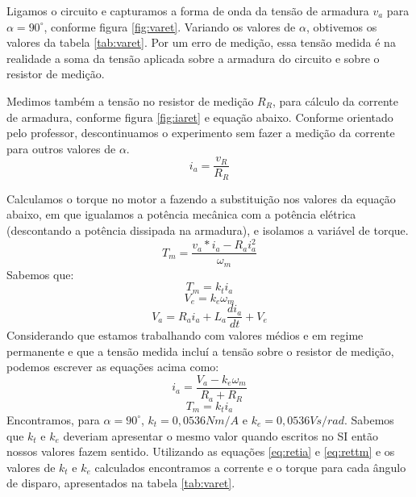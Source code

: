 \documentclass{article}
\begin{document}
Ligamos o circuito e capturamos a forma de onda da tensão de armadura $v_a$ para $\alpha=90^\circ$, conforme figura \ref{fig:varet}. Variando os valores de $\alpha$, obtivemos os valores da tabela \ref{tab:varet}. Por um erro de medição, essa tensão medida é na realidade a soma da tensão aplicada sobre a armadura do circuito e sobre o resistor de medição.

Medimos também a tensão no resistor de medição $R_R$, para cálculo da corrente de armadura, conforme figura \ref{fig:iaret} e equação abaixo. Conforme orientado pelo professor, descontinuamos o experimento sem fazer a medição da corrente para outros valores de $\alpha$. 
\begin{equation}
i_a=\frac{v_R}{R_R}
\end{equation}

Calculamos o torque no motor a fazendo a substituição nos valores da equação abaixo, em que igualamos a potência mecânica com a potência elétrica (descontando a potência dissipada na armadura), e isolamos a variável de torque.
\begin{equation}
T_m=\frac{v_a*i_a - R_a i_a^2}{\omega_m}
\end{equation}
Sabemos que: 
\begin{equation}
T_m = k_t i_a
\end{equation}
\begin{equation}
V_e = k_e \omega_m
\end{equation}
\begin{equation}
V_a = R_a i_a + L_a\frac{di_a}{dt} + V_e
\end{equation}
Considerando que estamos trabalhando com valores médios e em regime permanente e que a tensão medida incluí a tensão sobre o resistor de medição, podemos escrever as equações acima como:
\begin{equation}
i_a = \frac{V_a - k_e\omega_m}{R_a + R_R}
\label{eq:retia}
\end{equation}
\begin{equation}
T_m = k_t i_a
\label{eq:rettm}
\end{equation}
Encontramos, para $\alpha = 90^\circ$, $k_t = 0,0536 N m/A$ e $k_e = 0,0536 V s/rad$. Sabemos que $k_t$ e $k_e$ deveriam apresentar o mesmo valor quando escritos no SI então nossos valores fazem sentido.
Utilizando as equações \ref{eq:retia} e \ref{eq:rettm} e os valores de $k_t$ e $k_e$ calculados encontramos a corrente e o torque para cada ângulo de disparo, apresentados na tabela \ref{tab:varet}.
\end{document}
